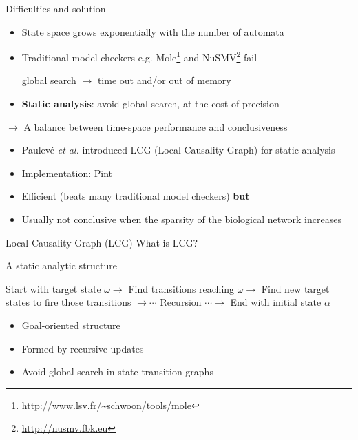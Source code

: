 \documentclass[8pt]{beamer}
\begin{document}
\begin{frame}{Difficulties and solution}
\begin{itemize}
\item State space grows exponentially with the number of automata
\item Traditional model checkers e.g. Mole\footnote{\url{http://www.lsv.fr/~schwoon/tools/mole}} and NuSMV\footnote{\url{http://nusmv.fbk.eu}} fail

global search $\to$ time out and/or out of memory
\item \textbf{Static analysis}: avoid global search, at the cost of precision
\end{itemize}
$\to$ A balance between time-space performance and conclusiveness
\vspace{0.25cm}
\begin{itemize}
    \item Paulev\'e \textit{et al.} introduced LCG (Local Causality Graph) \cite{folschette2015,pauleve2012} for static analysis
    \item Implementation: Pint
\end{itemize}

\begin{itemize}
    \item Efficient (beats many traditional model checkers) \textbf{but}
    \item Usually not conclusive when the sparsity of the biological network increases
\end{itemize}
\end{frame}

\begin{frame}{Local Causality Graph (LCG)}
What is LCG?

A static analytic structure

\vspace{0.5cm}
Start with target state $\omega\to$ Find transitions reaching $\omega\to$ Find new target states to fire those transitions $\to\cdots$ Recursion $\cdots\to$ End with initial state $\alpha$

\begin{itemize}
\item Goal-oriented structure 
\item Formed by recursive updates
\item Avoid global search in state transition graphs
\end{itemize}

\end{frame}
\end{document}
